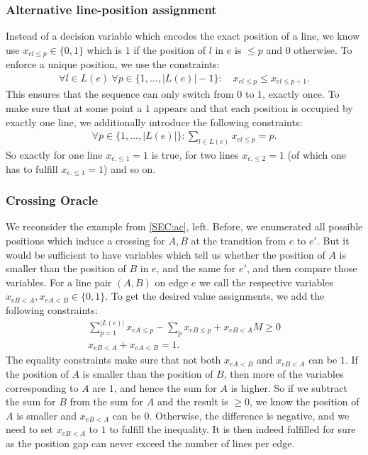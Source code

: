 \documentclass{llncs}
\begin{document}
\subsubsection{Alternative line-position assignment}
Instead of a decision variable which encodes the exact position of a line, we know use $x_{el\leq p} \in \{0,1\}$ which is $1$ if the position of $l$ in $e$ is $\leq p$ and $0$ otherwise. To enforce a unique position, we use the constraints:
\begin{align}
	\forall l \in L(e)~ \forall p \in \{1, ..., \left|L\left(e\right)\right|-1\}: \quad x_{el\leq p} \leq x_{el\leq p+1}. \label{EQ:up_constr}
\end{align}
This ensures that the sequence can only switch from $0$ to $1$, exactly once. To make sure that at some point a $1$ appears and that each position is occupied by exactly one line, we additionally introduce the following constraints:
\begin{align}
	\forall p \in \{1, ..., \left|L\left(e\right)\right|\}: \sum_{l \in L(e)} x_{el\leq p} = p. \label{EQ:01_constr}
\end{align}
So exactly for one line $x_{e.\leq 1} =1$ is true, for two lines $x_{e.\leq 2} = 1$ (of which one has to fulfill $x_{e.\leq 1} =1$) and so on.

\subsubsection{Crossing Oracle}
We reconsider the example from \ref{SEC:ac}, left. Before, we enumerated all possible positions which induce a crossing for $A, B$ at the transition from $e$ to $e'$. But it would be sufficient to have variables which tell us whether the position of $A$ is smaller than the position of $B$ in $e$, and the same for $e'$, and then compare those variables. For a line pair $(A,B)$ on edge $e$ we call the respective variables $x_{eB<A}, x_{eA<B} \in \{0, 1\}$. %
To get the desired value assignments, we add the following constraints:
\begin{gather}
	\sum_{p=1}^{\left|L\left(e\right)\right|} x_{eA\leq p} - \sum_{p} x_{eB\leq p} + x_{eB<A} M \geq 0 \\
	x_{eB<A} + x_{eA<B}=1.
\end{gather}
The equality constraints make sure that not both $x_{eA<B}$ and $x_{eB<A}$ can be $1$. If the position of $A$ is smaller than the position of $B$, then more of the variables corresponding to $A$ are $1$, and hence the sum for $A$ is higher. So if we subtract the sum for $B$ from the sum for $A$ and the result is $\geq 0$, we know the position of $A$ is smaller and $x_{eB<A}$ can be $0$. Otherwise, the difference is negative, and we need to set $x_{eB<A}$ to $1$ to fulfill the inequality. It is then indeed fulfilled for sure as the position gap can never exceed the number of lines per edge.
\end{document}
